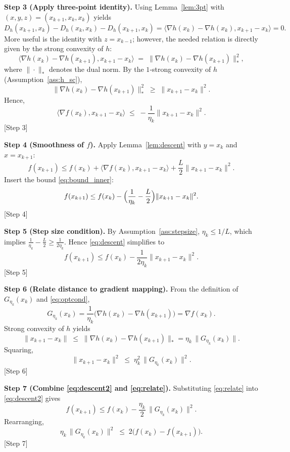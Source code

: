 \documentclass{article}
\newcommand{\grad}{\nabla}
\newcommand{\Breg}{D_{h}}
\newcommand{\inner}[2]{\langle #1,#2\rangle}
\begin{document}
\noindent\textbf{Step 3 (Apply three‑point identity).}  
Using Lemma~\ref{lem:3pt} with $(x,y,z)=(x_{k+1},x_{k},x_{k})$ yields
\[
\Breg(x_{k+1},x_{k})-\Breg(x_{k},x_{k})-\Breg(x_{k+1},x_{k})=
\inner{\grad h(x_{k})-\grad h(x_{k})}{x_{k+1}-x_{k}}=0.
\]
More useful is the identity with $z=x_{k-1}$; however, the needed relation is directly given by the strong convexity of $h$:
\[
\inner{\grad h(x_{k})-\grad h(x_{k+1})}{x_{k+1}-x_{k}}\;=\; \|\grad h(x_{k})-\grad h(x_{k+1})\|_{*}^{2},
\]
where $\|\cdot\|_{*}$ denotes the dual norm. By the $1$‑strong convexity of $h$ (Assumption~\ref{ass:h_sc}),
\[
\|\grad h(x_{k})-\grad h(x_{k+1})\|_{*}^{2}\;\ge\;\|x_{k+1}-x_{k}\|^{2}.
\]
Hence,
\begin{equation}\label{eq:bound_inner}
\inner{\grad f(x_{k})}{x_{k+1}-x_{k}}\;\le\; -\frac{1}{\eta_{k}}\|x_{k+1}-x_{k}\|^{2}.
\end{equation}
\hfill[Step 3]

\noindent\textbf{Step 4 (Smoothness of $f$).}  
Apply Lemma~\ref{lem:descent} with $y=x_{k}$ and $x=x_{k+1}$:
\[
f(x_{k+1})\le f(x_{k})+\inner{\grad f(x_{k})}{x_{k+1}-x_{k}}+\frac{L}{2}\|x_{k+1}-x_{k}\|^{2}.
\]
Insert the bound \eqref{eq:bound_inner}:
\begin{equation}\label{eq:descent}
f(x_{k+1})\le f(x_{k})-\Bigl(\frac{1}{\eta_{k}}-\frac{L}{2}\Bigr)\|x_{k+1}-x_{k}\|^{2}.
\end{equation}
\hfill[Step 4]

\noindent\textbf{Step 5 (Step size condition).}  
By Assumption~\ref{ass:stepsize}, $\eta_{k}\le 1/L$, which implies $\frac{1}{\eta_{k}}-\frac{L}{2}\ge\frac{1}{2\eta_{k}}$. Hence \eqref{eq:descent} simplifies to
\begin{equation}\label{eq:descent2}
f(x_{k+1})\le f(x_{k})-\frac{1}{2\eta_{k}}\|x_{k+1}-x_{k}\|^{2}.
\end{equation}
\hfill[Step 5]

\noindent\textbf{Step 6 (Relate distance to gradient mapping).}  
From the definition of $G_{\eta_{k}}(x_{k})$ and \eqref{eq:optcond},
\[
G_{\eta_{k}}(x_{k})=\frac{1}{\eta_{k}}\bigl(\grad h(x_{k})-\grad h(x_{k+1})\bigr)=\grad f(x_{k}).
\]
Strong convexity of $h$ yields
\[
\|x_{k+1}-x_{k}\|\;\le\;\|\grad h(x_{k})-\grad h(x_{k+1})\|_{*}
= \eta_{k}\,\|G_{\eta_{k}}(x_{k})\|.
\]
Squaring,
\begin{equation}\label{eq:relate}
\|x_{k+1}-x_{k}\|^{2}\;\le\;\eta_{k}^{2}\,\|G_{\eta_{k}}(x_{k})\|^{2}.
\end{equation}
\hfill[Step 6]

\noindent\textbf{Step 7 (Combine \eqref{eq:descent2} and \eqref{eq:relate}).}  
Substituting \eqref{eq:relate} into \eqref{eq:descent2} gives
\[
f(x_{k+1})\le f(x_{k})-\frac{\eta_{k}}{2}\,\|G_{\eta_{k}}(x_{k})\|^{2}.
\]
Rearranging,
\begin{equation}\label{eq:one_step}
\eta_{k}\,\|G_{\eta_{k}}(x_{k})\|^{2}\;\le\;2\bigl(f(x_{k})-f(x_{k+1})\bigr).
\end{equation}
\hfill[Step 7]
\end{document}
